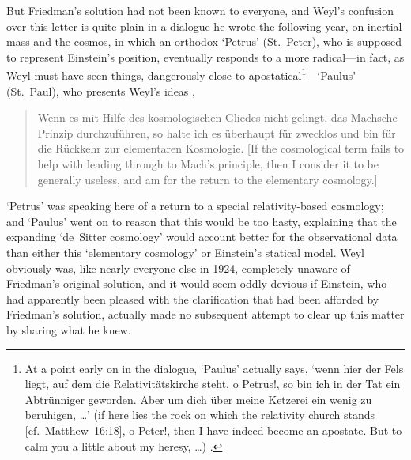 But Friedman's solution had not been known to everyone, and Weyl's confusion over this letter is quite plain in a dialogue he wrote the following year, on inertial mass and the cosmos, in which an orthodox `Petrus' (St.~Peter), who is supposed to represent Einstein's position, eventually responds to a more radical---in fact, as Weyl must have seen things, dangerously close to apostatical\footnote{At a point early on in the dialogue, `Paulus' actually says, `wenn hier der Fels liegt, auf dem die Relativit\"{a}tskirche steht, o Petrus!, so bin ich in der Tat ein Abtr\"{u}nniger geworden. Aber um dich \"{u}ber meine Ketzerei ein wenig zu beruhigen, \ldots' (if here lies the rock on which the relativity church stands [cf.~Matthew~16:18], o Peter!, then I have indeed become an apostate. But to calm you a little about my heresy, \ldots) \cite{Weyl1924}.}---`Paulus' (St.~Paul), who presents Weyl's ideas \cite{Weyl1924},
\begin{quote}
Wenn es mit Hilfe des kosmologischen Gliedes nicht gelingt, das Machsche Prinzip durchzuf\"{u}hren, so halte ich es \"{u}berhaupt f\"{u}r zwecklos und bin f\"{u}r die R\"{u}ckkehr zur elementaren Kosmologie. [If the cosmological term fails to help with leading through to Mach’s principle, then I consider it to be generally useless, and am for the return to the elementary cosmology.]
\end{quote}
`Petrus' was speaking here of a return to a special relativity-based cosmology; and `Paulus' went on to reason that this would be too hasty, explaining that the expanding `de~Sitter cosmology' would account better for the observational data than either this `elementary cosmology' or Einstein's statical model. Weyl obviously was, like nearly everyone else in 1924, completely unaware of Friedman's original solution, and it would seem oddly devious if Einstein, who had apparently been pleased with the clarification that had been afforded by Friedman's solution, actually made no subsequent attempt to clear up this matter by sharing what he knew. 

